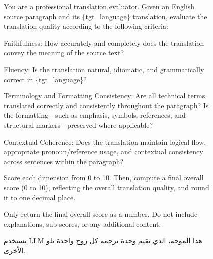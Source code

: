 \documentclass[11pt]{article}
\begin{document}
\begin{figure}[!t]
\centering
\begin{tcolorbox}[title=Prompt Template for LLM-score, halign=left]
\small
\ttfamily
You are a professional translation evaluator. Given an English source paragraph and its \{tgt\_language\} translation, evaluate the translation quality according to the following criteria:

\vspace{2mm}
Faithfulness: How accurately and completely does the translation convey the meaning of the source text?

Fluency: Is the translation natural, idiomatic, and grammatically correct in \{tgt\_language\}?

Terminology and Formatting Consistency: Are all technical terms translated correctly and consistently throughout the paragraph? Is the formatting—such as emphasis, symbols, references, and structural markers—preserved where applicable?

Contextual Coherence: Does the translation maintain logical flow, appropriate pronoun/reference usage, and contextual consistency across sentences within the paragraph?

\vspace{2mm}
Score each dimension from 0 to 10. Then, compute a final overall score (0 to 10), reflecting the overall translation quality, and round it to one decimal place.

Only return the final overall score as a number. Do not include explanations, sub-scores, or any additional content.

\end{tcolorbox}
    \caption{يستخدم LLM هذا الموجه، الذي يقيم وحدة ترجمة كل زوج واحدة تلو الأخرى.}
    \label{fig:llmscoreprompt}
\end{figure}
\end{document}

